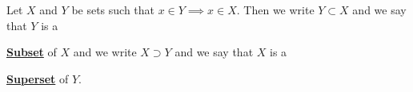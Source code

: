\newcommand{\QSubset}[0]{
    \textbf{\hyperref[def:Subset]{Subset}}
}
\newcommand{\QSubsets}[0]{
    \textbf{\hyperref[def:Subset]{Subsets}}
}
\newcommand{\Superset}[0]{
    \textbf{\hyperref[def:Subset]{Superset}}
}
\newcommand{\Supersets}[0]{
    \textbf{\hyperref[def:Subset]{Supersets}}
}
\begin{df}[Subset]
\label{def:Subset}

\rm
    Let $X$ and 
    $Y$ be sets
    such that $x \in Y\implies x \in X$. 
    Then we write $Y \subset X$ 
    and we say that $Y$ is a 
    \QSubset of $X$
    and we write $X \supset Y$
    and we say that $X$ is a 
    \Superset of $Y$. 
    
\end{df}
